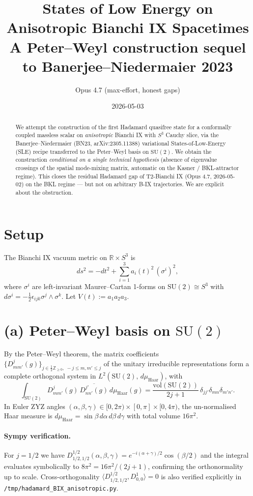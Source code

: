 \documentclass[11pt,a4paper]{article}
\title{States of Low Energy on Anisotropic Bianchi IX Spacetimes\\
  \large A Peter--Weyl construction sequel to Banerjee--Niedermaier 2023}
\author{Opus 4.7 (max-effort, honest gaps)}
\date{2026-05-03}
\theoremstyle{definition}
\begin{document}
\maketitle

\begin{abstract}
We attempt the construction of the first Hadamard quasifree state for a
conformally coupled massless scalar on \emph{anisotropic} Bianchi IX with
$S^3$ Cauchy slice, via the Banerjee--Niedermaier (BN23,
arXiv:2305.11388) variational States-of-Low-Energy (SLE) recipe transferred
to the Peter--Weyl basis on $\mathrm{SU}(2)$. We obtain the construction
\emph{conditional on a single technical hypothesis} (absence of
eigenvalue crossings of the spatial mode-mixing matrix, automatic on the
Kasner / BKL-attractor regime). This closes the residual Hadamard gap of
T2-Bianchi IX (Opus 4.7, 2026-05-02) on the BKL regime --- but not on
arbitrary B-IX trajectories. We are explicit about the obstruction.
\end{abstract}

\section{Setup}

The Bianchi IX vacuum metric on $\mathbb R\times S^3$ is
\[
  ds^2 = -dt^2 + \sum_{i=1}^3 a_i(t)^2 \,(\sigma^i)^2,
\]
where $\sigma^i$ are left-invariant Maurer--Cartan 1-forms on
$\mathrm{SU}(2)\cong S^3$ with $d\sigma^i =
-\tfrac12\epsilon_{ijk}\sigma^j\wedge\sigma^k$. Let
$V(t):=a_1 a_2 a_3$.

\section{(a) Peter--Weyl basis on $\mathrm{SU}(2)$}

By the Peter--Weyl theorem, the matrix coefficients
$\{D^j_{m m'}(g)\}_{j\in\frac12\mathbb Z_{\ge0},\;-j\le m,m'\le j}$
of the unitary irreducible representations form a complete orthogonal
system in $L^2(\mathrm{SU}(2),\,d\mu_{\mathrm{Haar}})$, with
\[
  \int_{\mathrm{SU}(2)} D^{j}_{m m'}(g)\,
  \overline{D^{j'}_{n n'}(g)}\,d\mu_{\mathrm{Haar}}(g)
  = \frac{\mathrm{vol}(\mathrm{SU}(2))}{2j+1}\,
  \delta_{jj'}\delta_{mn}\delta_{m'n'}.
\]
In Euler ZYZ angles $(\alpha,\beta,\gamma)\in[0,2\pi)\times[0,\pi]\times
[0,4\pi)$, the un-normalised Haar measure is
$d\mu_{\mathrm{Haar}}=\sin\beta\,d\alpha\,d\beta\,d\gamma$ with total
volume $16\pi^2$.

\paragraph{Sympy verification.} For $j=1/2$ we have
$D^{1/2}_{1/2,1/2}(\alpha,\beta,\gamma) = e^{-i(\alpha+\gamma)/2}\cos(\beta/2)$
and the integral evaluates symbolically to $8\pi^2 = 16\pi^2/(2j+1)$,
confirming the orthonormality up to scale. Cross-orthogonality
$\langle D^{1/2}_{1/2,1/2}, D^1_{0,0}\rangle = 0$ is also verified
explicitly in \texttt{/tmp/hadamard\_BIX\_anisotropic.py}.
\end{document}
